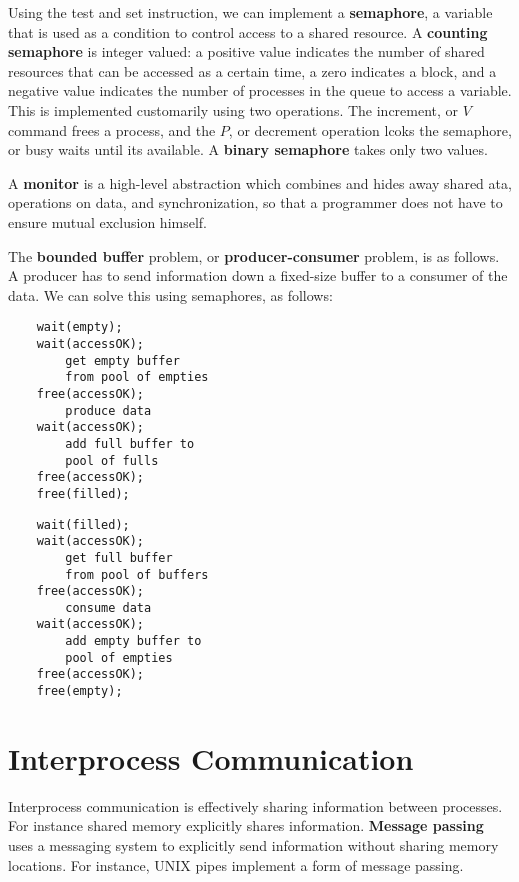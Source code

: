 Using the test and set instruction, we can implement a {\bf semaphore}, a variable that is used as a condition to control access to a shared resource.  A {\bf counting semaphore} is integer valued: a positive value indicates the number of shared resources that can be accessed as a certain time, a zero indicates a block, and a negative value indicates the number of processes in the queue to access a variable. This is implemented customarily using two operations. The increment, or $V$ command frees a process, and the $P$, or decrement operation lcoks the semaphore, or busy waits until its available. A {\bf binary semaphore} takes only two values.

A {\bf monitor} is a high-level abstraction which combines and hides away shared ata, operations on data, and synchronization, so that a programmer does not have to ensure mutual exclusion himself.

The {\bf bounded buffer} problem, or {\bf producer-consumer} problem, is as follows. A producer has to send information down a fixed-size buffer to a consumer of the data. We can solve this using semaphores, as follows:

\begin{multicols}{2}
\begin{verbatim}
    wait(empty);
    wait(accessOK);
        get empty buffer
        from pool of empties
    free(accessOK);
        produce data
    wait(accessOK);
        add full buffer to
        pool of fulls
    free(accessOK);
    free(filled);
\end{verbatim}

\begin{verbatim}
    wait(filled);
    wait(accessOK);
        get full buffer
        from pool of buffers
    free(accessOK);
        consume data
    wait(accessOK);
        add empty buffer to
        pool of empties
    free(accessOK);
    free(empty);
\end{verbatim}
\end{multicols}

\chapter{Interprocess Communication}

Interprocess communication is effectively sharing information between processes. For instance shared memory explicitly shares information. {\bf Message passing} uses a messaging system to explicitly send information without sharing memory locations. For instance, UNIX pipes implement a form of message passing.

